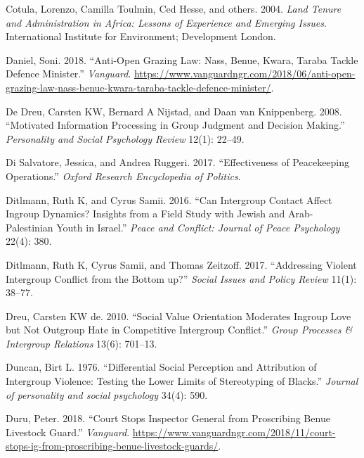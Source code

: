 \documentclass[11pt]{article}
\begin{document}
\leavevmode\hypertarget{ref-cotula2004land}{}%
Cotula, Lorenzo, Camilla Toulmin, Ced Hesse, and others. 2004.
\emph{Land Tenure and Administration in Africa: Lessons of Experience
and Emerging Issues}. International Institute for Environment;
Development London.

\leavevmode\hypertarget{ref-daniel2018anti}{}%
Daniel, Soni. 2018. ``Anti-Open Grazing Law: Nass, Benue, Kwara, Taraba
Tackle Defence Minister.'' \emph{Vanguard}.
\url{https://www.vanguardngr.com/2018/06/anti-open-grazing-law-nass-benue-kwara-taraba-tackle-defence-minister/}.

\leavevmode\hypertarget{ref-de2008motivated}{}%
De Dreu, Carsten KW, Bernard A Nijstad, and Daan van Knippenberg. 2008.
``Motivated Information Processing in Group Judgment and Decision
Making.'' \emph{Personality and Social Psychology Review} 12(1): 22--49.

\leavevmode\hypertarget{ref-di2017effectiveness}{}%
Di Salvatore, Jessica, and Andrea Ruggeri. 2017. ``Effectiveness of
Peacekeeping Operations.'' \emph{Oxford Research Encyclopedia of
Politics}.

\leavevmode\hypertarget{ref-ditlmann2016can}{}%
Ditlmann, Ruth K, and Cyrus Samii. 2016. ``Can Intergroup Contact Affect
Ingroup Dynamics? Insights from a Field Study with Jewish and
Arab-Palestinian Youth in Israel.'' \emph{Peace and Conflict: Journal of
Peace Psychology} 22(4): 380.

\leavevmode\hypertarget{ref-ditlmann2017addressing}{}%
Ditlmann, Ruth K, Cyrus Samii, and Thomas Zeitzoff. 2017. ``Addressing
Violent Intergroup Conflict from the Bottom up?'' \emph{Social Issues
and Policy Review} 11(1): 38--77.

\leavevmode\hypertarget{ref-dreu2010social}{}%
Dreu, Carsten KW de. 2010. ``Social Value Orientation Moderates Ingroup
Love but Not Outgroup Hate in Competitive Intergroup Conflict.''
\emph{Group Processes \& Intergroup Relations} 13(6): 701--13.

\leavevmode\hypertarget{ref-duncan1976differential}{}%
Duncan, Birt L. 1976. ``Differential Social Perception and Attribution
of Intergroup Violence: Testing the Lower Limits of Stereotyping of
Blacks.'' \emph{Journal of personality and social psychology} 34(4):
590.

\leavevmode\hypertarget{ref-duru2018court}{}%
Duru, Peter. 2018. ``Court Stops Inspector General from Proscribing
Benue Livestock Guard.'' \emph{Vanguard}.
\url{https://www.vanguardngr.com/2018/11/court-stops-ig-from-proscribing-benue-livestock-guards/}.
\end{document}
